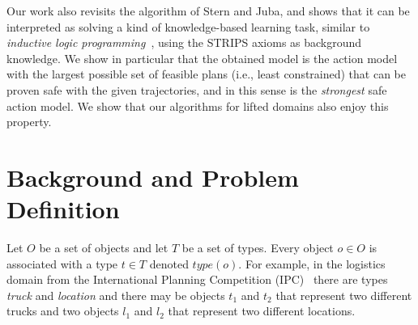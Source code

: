 \documentclass{article}
\newcommand{\type}{\textit{type}}
\begin{document}


Our work also revisits the algorithm of Stern and Juba, and shows that it can be interpreted as solving a kind of knowledge-based learning task, similar to \emph{inductive logic programming}~\cite{muggleton1994inductive}, using the STRIPS axioms as background knowledge. We show in particular that the obtained model is the action model with the largest possible set of feasible plans (i.e., least constrained) that can be proven safe with the given trajectories, and in this sense is the \emph{strongest} safe action model. We show that our algorithms for lifted domains also enjoy this property.











\section{Background and Problem Definition}

Let $O$ be a set of objects and let $T$ be a set of types. 
Every object $o\in O$ is associated with a type $t\in T$ denoted $\type(o)$. 
For example, in the logistics domain from the International Planning Competition (IPC)~\cite{ipc} there are types \emph{truck} and \emph{location} and there may be objects $t_1$ and $t_2$ that represent two different trucks and two objects $l_1$ and $l_2$ that represent two different locations. 
\end{document}

